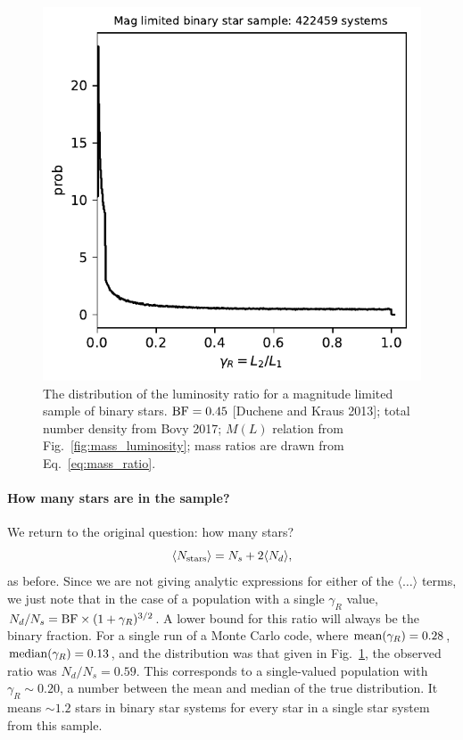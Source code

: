 \documentclass{emulateapj}
\begin{document}
\begin{figure}[!t]
	\begin{center}
		\includegraphics[scale=.8]{figures/gammaR_distribn_mag_limited.pdf}
	\end{center}
	\caption{The distribution of the luminosity ratio for a magnitude limited 
		sample of binary stars. ${\rm BF} = 0.45$ [Duchene and Kraus 2013]; 
		total 
		number density from Bovy 2017; $M(L)$ relation from 
		Fig.~\ref{fig:mass_luminosity}; mass ratios are drawn from 
		Eq.~\ref{eq:mass_ratio}.}
	\label{fig:gammaR_distribn_mag_limited}
\end{figure}

\paragraph{How many stars are in the sample?}

We return to the original question: how many stars?
\begin{equation}
\langle N_{\rm stars} \rangle = N_s + 2 \langle N_d \rangle,
\end{equation}
as before.
Since we are not giving analytic expressions for either of the $\langle \ldots 
\rangle$ terms, we just note that in the case of a population with a single 
$\gamma_R$ value, $N_d/N_s = {\rm BF} \times (1 + \gamma_R)^{3/2}$. A lower
bound for this ratio will always be the binary fraction.
For a single run of a Monte Carlo code, where ${\rm mean}(\gamma_R) = 0.28$, 
${\rm median}(\gamma_R) = 0.13$, and the distribution was that given in 
Fig.~\ref{fig:gammaR_distribn_mag_limited}, the observed ratio was $N_d/N_s = 
0.59$.
This corresponds to a single-valued population with $\gamma_R \sim 0.20$, a
number between the mean and median of the true distribution.
It means $\sim 1.2$ stars in binary star systems for every star in a single 
star system from this sample.
\end{document}

